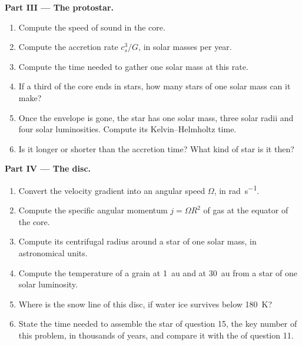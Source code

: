 \begin{problem}
\noindent\textbf{Part III --- The protostar.}
\begin{enumerate}[resume]
  \item Compute the speed of sound in the core.
  \item Compute the accretion rate $c_s^3/G$, in solar masses per year.
  \item Compute the time needed to gather one solar mass at this rate.
  \item If a third of the core ends in stars, how many stars of one solar mass
        can it make?
  \item Once the envelope is gone, the star has one solar mass, three solar
        radii and four solar luminosities. Compute its Kelvin--Helmholtz time.
  \item Is it longer or shorter than the accretion time? What kind of star is
        it then?
\end{enumerate}

\noindent\textbf{Part IV --- The disc.}
\begin{enumerate}[resume]
  \item Convert the velocity gradient into an angular speed $\Omega$, in
        \unit{rad.s^{-1}}.
  \item Compute the specific angular momentum $j = \Omega R^2$ of gas at the
        equator of the core.
  \item Compute its centrifugal radius around a star of one solar mass, in
        astronomical units.
  \item Compute the temperature of a grain at \qty{1}{au} and at \qty{30}{au}
        from a star of one solar luminosity.
  \item Where is the snow line of this disc, if water ice survives below
        \qty{180}{K}?
  \item State the time needed to assemble the star of question 15, the key
        number of this problem, in thousands of years, and compare it with the
         of question 11.
\end{enumerate}
\end{problem}
